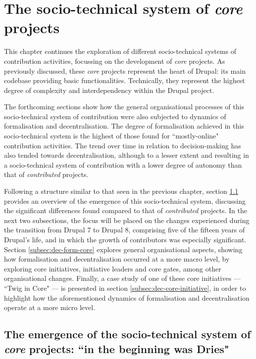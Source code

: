\chapter{The socio-technical system of \textit{core} projects}
\label{chapter:core-system}

This chapter continues the exploration of different socio-technical systems of contribution activities, focussing on the development of \textit{core} projects. As previously discussed, these \textit{core} projects represent the heart of Drupal: its main codebase providing basic functionalities. Technically, they represent the highest degree of complexity and interdependency within the Drupal project.

The forthcoming sections show how the general organisational processes of this socio-technical system of contribution were also subjected to dynamics of formalisation and decentralisation. The degree of formalisation achieved in this socio-technical system is the highest of those found for ``mostly-online" contribution activities. The trend over time in relation to decision-making has also tended towards decentralisation, although to a lesser extent and resulting in a socio-technical system of contribution with a lower degree of autonomy than that of \textit{contributed} projects.

Following a structure similar to that seen in the previous chapter, section \ref{subsec:dries-beginning} provides an overview of the emergence of this socio-technical system, discussing the significant differences found compared to that of \textit{contributed} projects. In the next two subsections, the focus will be placed on the changes experienced during the transition from Drupal 7 to Drupal 8, comprising five of the fifteen years of Drupal's life, and in which the growth of contributors was especially significant. Section \ref{subsec:dec-form-core} explores general organisational aspects, showing how formalisation and decentralisation occurred at a more macro level, by exploring core initiatives, initiative leaders and core gates, among other organisational changes. Finally, a case study of one of these core initiatives --- ``Twig in Core" --- is presented in section \ref{subsec:dec-core-initiative}, in order to highlight how the aforementioned dynamics of formalisation and decentralisation operate at a more micro level.

\section{The emergence of the socio-technical system of \textit{core} projects: ``in the beginning was Dries"}
\label{subsec:dries-beginning}

